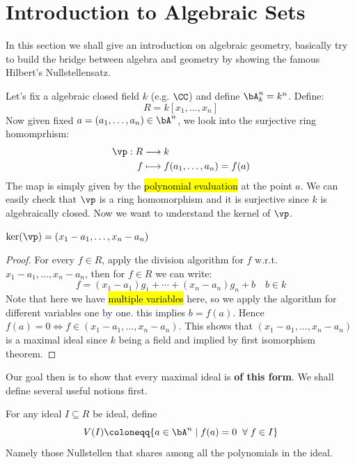 \section{Introduction to Algebraic Sets}

In this section we shall give an introduction on algebraic geometry, basically try to build the
bridge between algebra and geometry by showing the famous Hilbert's Nullstellensatz.

Let's fix a algebraic closed field \( k \) (e.g. \( \CC \)) and define \( \bA_{k}^n = k^n\). Define:
\[
	R = k[x_1,\ldots, x_n]
\]
Now given fixed \( a = (a_1,\ldots, a_n) \in \bA^n \), we look into the surjective ring homomprhism:
\[
	\begin{aligned}
		\vp: R & \longrightarrow k                     \\
		f      & \longmapsto f(a_1,\ldots, a_n) = f(a)
	\end{aligned}
\]
The map is simply given by the \hl{polynomial evaluation} at the point \( a \). We can easily check that
\( \vp \) is a ring homomorphism and it is surjective since \( k \) is algebraically closed. Now we
want to understand the kernel of \( \vp \).
\begin{claim}
	\( \ker(\vp) = (x_1 - a_1, \ldots, x_n - a_n) \)
\end{claim}

\begin{proof}
	For every \( f \in R \), apply the division algorithm for \( f \) w.r.t. \( x_1-a_1, \ldots, x_n -
	a_n\), then for \( f\in R \) we can write:
	\[
		f = (x_1 - a_1)g_1 + \cdots + (x_n - a_n)g_n + b \quad b \in k
	\]
	Note that here we have \hl{multiple variables} here, so we apply the algorithm for different variables
	one by one.
	this implies \( b = f(a) \). Hence \( f(a) = 0 \iff f \in (x_1 - a_1, \ldots, x_n - a_n) \).
	This shows that \( (x_1-a_1,\ldots, x_n - a_n) \) is a maximal ideal since \( k \) being a field
	and implied by first isomorphism theorem.
\end{proof}
Our goal then is to show that every maximal ideal is \textbf{of this form}. We shall define several
useful notions first.

\begin{definition}
	For any ideal \( I \subseteq R \) be ideal, define
	\[
		V(I) \coloneqq  \{a \in \bA^n \; | \; f(a) = 0 \; \; \forall \; f \in I\}
	\]
	Namely those Nullstellen that shares among all the polynomials in the ideal.
\end{definition}

